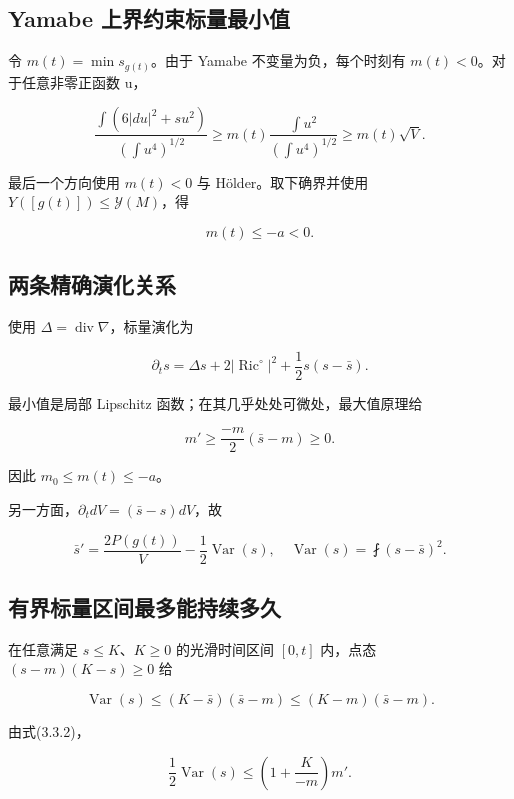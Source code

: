 \documentclass[UTF8,11pt,openany,fontset=none]{ctexbook}
\theoremstyle{definition}
\theoremstyle{remark}
\begin{document}
\subsection{Yamabe 上界约束标量最小值}\label{v3-yamabe-ux4e0aux754cux7ea6ux675fux6807ux91cfux6700ux5c0fux503c}

令 \(m(t)=\min s_{g(t)}\)。由于 Yamabe 不变量为负，每个时刻有 \(m(t)<0\)。对于任意非零正函数 u，

\[
 \frac{\int(6|du|^2+s u^2)}{(\int u^4)^{1/2}}
 \ge m(t)\frac{\int u^2}{(\int u^4)^{1/2}}
 \ge m(t)\sqrt V.
\]

最后一个方向使用 \(m(t)<0\) 与 Hölder。取下确界并使用 \(Y([g(t)])\le\mathcal Y(M)\)，得

\[
 \boxed{m(t)\le-a<0.}
\tag{3.3.1}
\]

\subsection{两条精确演化关系}\label{v3-ux4e24ux6761ux7cbeux786eux6f14ux5316ux5173ux7cfb}

使用 \(\Delta=\operatorname{div}\nabla\)，标量演化为

\[
 \partial_t s=\Delta s+2|\operatorname{Ric}^{\circ}|^2
             +\frac12s(s-\bar s).
\]

最小值是局部 Lipschitz 函数；在其几乎处处可微处，最大值原理给

\[
 m'\ge\frac{-m}{2}(\bar s-m)\ge0.
\tag{3.3.2}
\]

因此 \(m_0\le m(t)\le-a\)。

另一方面，\(\partial_t dV=(\bar s-s)dV\)，故

\[
 \boxed{
 \bar s'=\frac{2P(g(t))}{V}-\frac12\operatorname{Var}(s),
 \quad \operatorname{Var}(s)=\fint(s-\bar s)^2.
 }
\tag{3.3.3}
\]

\subsection{有界标量区间最多能持续多久}\label{v3-ux6709ux754cux6807ux91cfux533aux95f4ux6700ux591aux80fdux6301ux7eedux591aux4e45}

在任意满足 \(s\le K\)、\(K\ge0\) 的光滑时间区间 \([0,t]\) 内，点态 \((s-m)(K-s)\ge0\) 给

\[
 \operatorname{Var}(s)\le(K-\bar s)(\bar s-m)
                      \le(K-m)(\bar s-m).
\]

由式(3.3.2)，

\[
 \frac12\operatorname{Var}(s)
 \le\left(1+\frac{K}{-m}\right)m'.
\]
\end{document}
